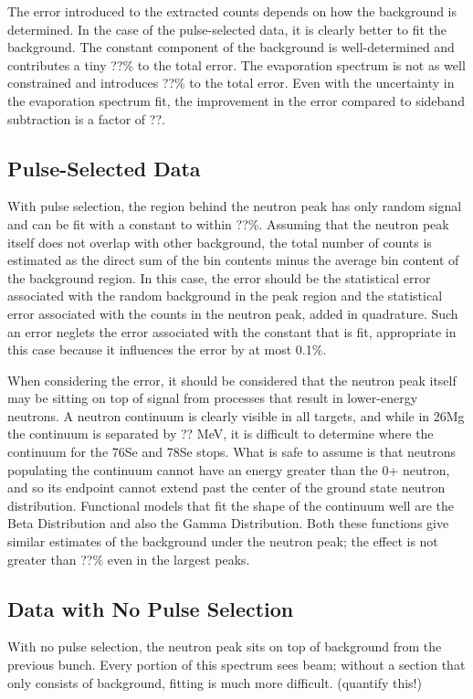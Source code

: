 The error introduced to the extracted counts depends on how the background is determined.  In the case of the pulse-selected data, it is clearly better to fit the background.  The constant component of the background is well-determined and contributes a tiny ??\% to the total error.  The evaporation spectrum is not as well constrained and introduces ??\% to the total error.  Even with the uncertainty in the evaporation spectrum fit, the improvement in the error compared to sideband subtraction is a factor of ??.

\subsection{Pulse-Selected Data}
With pulse selection, the region behind the neutron peak has only random signal and can be fit with a constant to within ??\%.  Assuming that the neutron peak itself does not overlap with other background, the total number of counts is estimated as the direct sum of the bin contents minus the average bin content of the background region.  In this case, the error should be the statistical error associated with the random background in the peak region and the statistical error associated with the counts in the neutron peak, added in quadrature.  Such an error neglets the error associated with the constant that is fit, appropriate in this case because it influences the error by at most 0.1\%.

When considering the error, it should be considered that the neutron peak itself may be sitting on top of signal from processes that result in lower-energy neutrons.  A neutron continuum is clearly visible in all targets, and while in 26Mg the continuum is separated by ?? MeV, it is difficult to determine where the continuum for the 76Se and 78Se stops.  What is safe to assume is that neutrons populating the continuum cannot have an energy greater than the 0+ neutron, and so its endpoint cannot extend past the center of the ground state neutron distribution.  Functional models that fit the shape of the continuum well are the Beta Distribution and also the Gamma Distribution.  Both these functions give similar estimates of the background under the neutron peak; the effect is not greater than ??\% even in the largest peaks.

\subsection{Data with No Pulse Selection}
With no pulse selection, the neutron peak sits on top of background from the previous bunch.  Every portion of this spectrum sees beam; without a section that only consists of background, fitting is much more difficult. (quantify this!)

